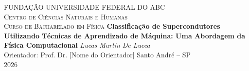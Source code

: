 \documentclass[12pt, a4paper, oneside]{report}
\begin{document}
\begin{titlepage}
    \centering
    \vspace*{1cm}
    {\scshape\Large FUNDAÇÃO UNIVERSIDADE FEDERAL DO ABC \\ Centro de Ciências Naturais e Humanas \\ Curso de Bacharelado em Física}
    \vfill
    {\Huge\bfseries Classificação de Supercondutores Utilizando Técnicas de Aprendizado de Máquina: Uma Abordagem da Física Computacional}
    \vfill
    {\Large\itshape Lucas Martin De Lucca}\\[1cm]
    {\large Orientador: Prof. Dr. [Nome do Orientador]}
    \vfill
    {\large Santo André -- SP \\ 2026}
\end{titlepage}

\newpage\thispagestyle{empty}\mbox{}
\end{document}
